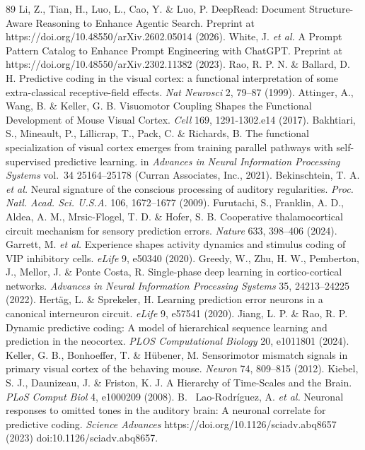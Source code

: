 \documentclass[12pt]{article}
\begin{document}
\begin{thebibliography}{89}
 Li, Z., Tian, H., Luo, L., Cao, Y. \& Luo, P. DeepRead: Document Structure-Aware Reasoning to Enhance Agentic Search. Preprint at https://doi.org/10.48550/arXiv.2602.05014 (2026).
 White, J. \emph{et al.} A Prompt Pattern Catalog to Enhance Prompt Engineering with ChatGPT. Preprint at https://doi.org/10.48550/arXiv.2302.11382 (2023).
 Rao, R. P. N. \& Ballard, D. H. Predictive coding in the visual cortex: a functional interpretation of some extra-classical receptive-field effects. \emph{Nat Neurosci} 2, 79--87 (1999).
 Attinger, A., Wang, B. \& Keller, G. B. Visuomotor Coupling Shapes the Functional Development of Mouse Visual Cortex. \emph{Cell} 169, 1291-1302.e14 (2017).
 Bakhtiari, S., Mineault, P., Lillicrap, T., Pack, C. \& Richards, B. The functional specialization of visual cortex emerges from training parallel pathways with self-supervised predictive learning. in \emph{Advances in Neural Information Processing Systems} vol.~34 25164--25178 (Curran Associates, Inc., 2021).
 Bekinschtein, T. A. \emph{et al.} Neural signature of the conscious processing of auditory regularities. \emph{Proc. Natl. Acad. Sci. U.S.A.} 106, 1672--1677 (2009).
 Furutachi, S., Franklin, A. D., Aldea, A. M., Mrsic-Flogel, T. D. \& Hofer, S. B. Cooperative thalamocortical circuit mechanism for sensory prediction errors. \emph{Nature} 633, 398--406 (2024).
 Garrett, M. \emph{et al.} Experience shapes activity dynamics and stimulus coding of VIP inhibitory cells. \emph{eLife} 9, e50340 (2020).
 Greedy, W., Zhu, H. W., Pemberton, J., Mellor, J. \& Ponte Costa, R. Single-phase deep learning in cortico-cortical networks. \emph{Advances in Neural Information Processing Systems} 35, 24213--24225 (2022).
 Hertäg, L. \& Sprekeler, H. Learning prediction error neurons in a canonical interneuron circuit. \emph{eLife} 9, e57541 (2020).
 Jiang, L. P. \& Rao, R. P. Dynamic predictive coding: A model of hierarchical sequence learning and prediction in the neocortex. \emph{PLOS Computational Biology} 20, e1011801 (2024).
 Keller, G. B., Bonhoeffer, T. \& Hübener, M. Sensorimotor mismatch signals in primary visual cortex of the behaving mouse. \emph{Neuron} 74, 809--815 (2012).
 Kiebel, S. J., Daunizeau, J. \& Friston, K. J. A Hierarchy of Time-Scales and the Brain. \emph{PLoS Comput Biol} 4, e1000209 (2008).
 B.~ Lao-Rodríguez, A. \emph{et al.} Neuronal responses to omitted tones in the auditory brain: A neuronal correlate for predictive coding. \emph{Science Advances} https://doi.org/10.1126/sciadv.abq8657 (2023) doi:10.1126/sciadv.abq8657.

\end{thebibliography}
\end{document}
